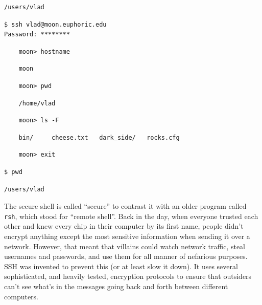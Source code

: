 \documentclass{book}
\begin{document}
\begin{verbatim}
/users/vlad
\end{verbatim}

\begin{verbatim}
$ ssh vlad@moon.euphoric.edu
Password: ********
\end{verbatim}

\begin{verbatim}
    moon> hostname
\end{verbatim}

\begin{verbatim}
    moon
\end{verbatim}

\begin{verbatim}
    moon> pwd
\end{verbatim}

\begin{verbatim}
    /home/vlad
\end{verbatim}

\begin{verbatim}
    moon> ls -F
\end{verbatim}

\begin{verbatim}
    bin/     cheese.txt   dark_side/   rocks.cfg
\end{verbatim}

\begin{verbatim}
    moon> exit
\end{verbatim}

\begin{verbatim}
$ pwd
\end{verbatim}

\begin{verbatim}
/users/vlad
\end{verbatim}

The secure shell is called ``secure'' to contrast it with an older
program called \texttt{rsh}, which stood for ``remote shell''. Back in
the day, when everyone trusted each other and knew every chip in their
computer by its first name, people didn't encrypt anything except the
most sensitive information when sending it over a network. However, that
meant that villains could watch network traffic, steal usernames and
passwords, and use them for all manner of nefarious purposes. SSH was
invented to prevent this (or at least slow it down). It uses several
sophisticated, and heavily tested, encryption protocols to ensure that
outsiders can't see what's in the messages going back and forth between
different computers.
\end{document}
